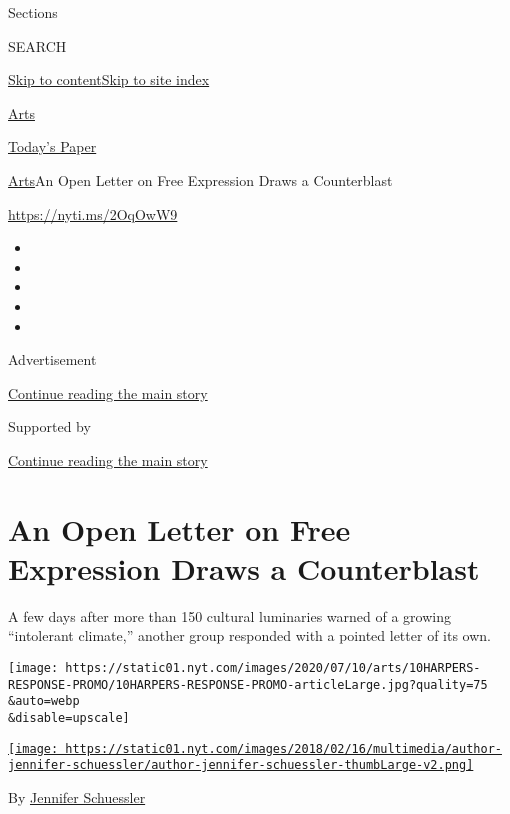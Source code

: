 Sections

SEARCH

\protect\hyperlink{site-content}{Skip to
content}\protect\hyperlink{site-index}{Skip to site index}

\href{https://www.nytimes.com/section/arts}{Arts}

\href{https://myaccount.nytimes.com/auth/login?response_type=cookie\&client_id=vi}{}

\href{https://www.nytimes.com/section/todayspaper}{Today's Paper}

\href{/section/arts}{Arts}\textbar{}An Open Letter on Free Expression
Draws a Counterblast

\url{https://nyti.ms/2OqOwW9}

\begin{itemize}
\item
\item
\item
\item
\item
\end{itemize}

Advertisement

\protect\hyperlink{after-top}{Continue reading the main story}

Supported by

\protect\hyperlink{after-sponsor}{Continue reading the main story}

\hypertarget{an-open-letter-on-free-expression-draws-a-counterblast}{%
\section{An Open Letter on Free Expression Draws a
Counterblast}\label{an-open-letter-on-free-expression-draws-a-counterblast}}

A few days after more than 150 cultural luminaries warned of a growing
``intolerant climate,'' another group responded with a pointed letter of
its own.

\texttt{[image: https://static01.nyt.com/images/2020/07/10/arts/10HARPERS-RESPONSE-PROMO/10HARPERS-RESPONSE-PROMO-articleLarge.jpg?quality=75\\\&auto=webp\\\&disable=upscale]}

\href{https://www.nytimes.com/by/jennifer-schuessler}{\texttt{[image: https://static01.nyt.com/images/2018/02/16/multimedia/author-jennifer-schuessler/author-jennifer-schuessler-thumbLarge-v2.png]}}

By \href{https://www.nytimes.com/by/jennifer-schuessler}{Jennifer
Schuessler}

